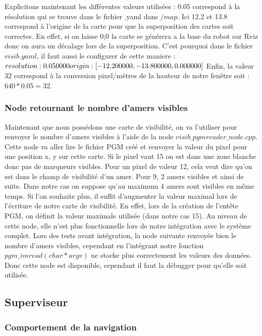 \documentclass[10pt,a4paper]{article}
\begin{document}
Explicitons maintenant les différentes valeurs utilisées : 0.05 correspond à la résolution qui se trouve dans le fichier .yaml dans $/map$. Ici 12.2 et 13.8 correspond à l'origine de la carte pour que la superposition des cartes soit correctes. En effet, si on laisse 0;0 la carte se générera a la base du robot sur Rviz donc on aura un décalage lors de la superposition. C'est pourquoi dans le fichier $visib.yaml$, il faut aussi le configurer de cette maniere :\\
$resolution: 0.050000\\
origin: [-12.200000, -13.800000, 0.000000]\\
$
Enfin, la valeur 32 correspond à la conversion pixel/mètres de la hauteur de notre fenêtre soit :\\ $640*0.05=32$.

\subsubsection{Node retournant le nombre d'amers visibles}
Maintenant que nous possédons une carte de visibilité, on va l'utiliser pour renvoyer le nombre d'amers visibles à l'aide de la node $visib\_pgmreader\_node.cpp$. Cette node va aller lire le fichier PGM créé et renvoyer la valeur du pixel pour une position x, y sur cette carte. Si le pixel vaut 15 on est dans une zone blanche donc pas de marqueurs visibles. Pour un pixel de valeur 12, cela veut dire qu'on est dans le champ de visibilité d'un amer. Pour 9, 2 amers visibles et ainsi de suite. Dans notre cas on suppose qu'au maximum 4 amers sont visibles en même temps. Si l'on souhaite plus, il suffit d'augmenter la valeur maximal lors de l’écriture  de notre carte de visibilité. En effet, lors de la création de l’entête PGM, on définit la valeur maximale utilisée (dans notre cas 15).
Au niveau de cette node, elle n'est plus fonctionnelle lors de notre intégration avec le système complet. Lors des tests avant intégration, la node suivante renvoyée bien le nombre d'amers visibles, cependant en l'intégrant notre fonction $pgm\_imread(char *argv)$ ne stocke plus correctement les valeurs des données. Donc cette node est disponible, cependant il faut la débugger pour qu'elle soit utilisée.

\subsection{Superviseur}
\label{sec:Superviseur}

\subsubsection{Comportement de la navigation}
\end{document}
